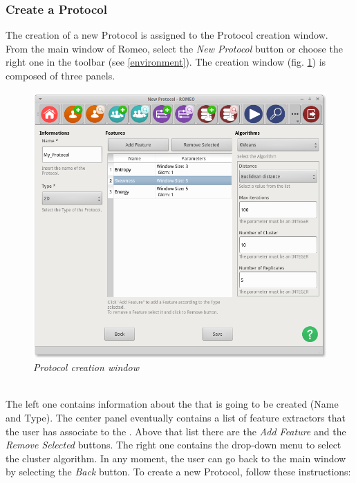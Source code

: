 \subsubsection{Create a Protocol}
\label{createprotocol}
The creation of a new Protocol\g{} is assigned to the Protocol\g{} creation window.\\
From the main window of Romeo, select the \textit{New Protocol} button or choose the right one in the toolbar (see \ref{environment}). The \protocol{} creation window (fig. \ref{createprotocolimg}) is composed of three panels.
\begin{figure}[!h]
\begin{center}
\includegraphics[scale=0.4]{./Images/NewProtocolView}
\caption{\textit{Protocol creation window}}
\label{createprotocolimg}
\end{center}
\end{figure}
\pagebreak
\\The left one contains information about the \protocol{} that is going to be created (Name and Type). The center panel eventually contains a list of feature extractors\g{} that the user has associate to the \protocol{}. Above that list there are the \textit{Add Feature} and the \textit{Remove Selected} buttons. The right one contains the drop-down menu to select the cluster algorithm. In any moment, the user can go back to the main window by selecting the \textit{Back} button.
To create a new Protocol\g{}, follow these instructions:
